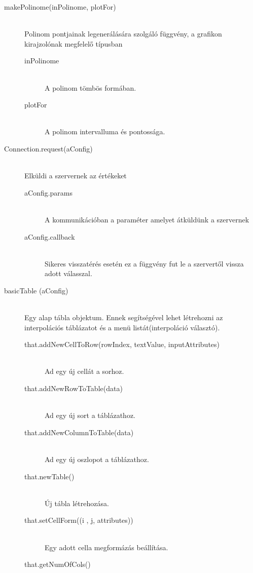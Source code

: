 	\begin{description}
		\item[makePolinome(inPolinome, plotFor)] \hfill \\ 
			Polinom pontjainak legenerálására szolgáló függvény, a grafikon kirajzolónak megfelelő típusban
			\begin{description}
				\item[inPolinome] \hfill \\ 
					A polinom tömbös formában.
				\item[plotFor] \hfill \\ 
					A polinom intervalluma és pontossága.
			\end{description}
		\item[Connection.request(aConfig)] \hfill \\ 
			Elküldi a szervernek az értékeket
			\begin{description}
				\item[aConfig.params] \hfill \\
				A kommunikációban a paraméter amelyet átküldünk a szervernek
				\item[aConfig.callback] \hfill \\
				Sikeres visszatérés esetén ez a függvény fut le a szervertől vissza adott válasszal. 
			\end{description}
		\item[basicTable (aConfig)] \hfill \\ 
			Egy alap tábla objektum. Ennek segítségével lehet létrehozni az interpolációs táblázatot és a menü listát(interpoláció választó).
			\begin{description}
			\item[that.addNewCellToRow(rowIndex, textValue, inputAttributes)] 
				\hfill \\  Ad egy új cellát a sorhoz.
			\item[that.addNewRowToTable(data)]
				\hfill \\ Ad egy új sort a táblázathoz.
			\item[that.addNewColumnToTable(data)]
				\hfill \\ Ad egy új oszlopot a táblázathoz.
			\item[that.newTable()] 
				\hfill \\ Új tábla létrehozása.
			\item[that.setCellForm((i , j, attributes))] 
				\hfill \\ Egy adott cella megformázás beállítása.
			\item[that.getNumOfCols()] 

\end{description}
\end{description}
